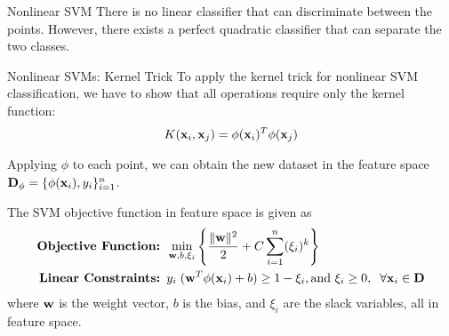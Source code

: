 \begin{frame}{Nonlinear SVM}
There is no linear classif\/{i}er that can discriminate between the
points. However, there exists a perfect quadratic classif\/{i}er that can
separate the two classes.

\begin{figure}[!t]
\end{figure}
\end{frame}


\begin{frame}{Nonlinear SVMs: Kernel Trick}
To apply the kernel trick for nonlinear SVM classif\/{i}cation, we
have to show that all operations require only the kernel function:
\begin{align*}
K(\mathbf{x}_i, \mathbf{x}_{j}) = \phi(\mathbf{x}_i)^T \phi(\mathbf{x}_{j})
\end{align*}

\medskip
Applying $\phi$ to each point, we
can obtain the new dataset in the
feature space
$\mathbf{D}_\phi = \{ \phi(\mathbf{x}_i), y_i \}_{i=1}^n$.

\medskip
The SVM objective function in
feature space is given as
\begin{align*}
        \mbox{\bf Objective Function: } & \min_{\mathbf{w},b,\xi_i}
        \left\{ {\| \mathbf{w} \|^2 \over 2} + C \sum_{i=1}^n (\xi_i)^k\right\}\\
  \mbox{\bf Linear Constraints: } & y_i \; (\mathbf{w}^T\phi(\mathbf{x}_i) + b) \ge
  1 - \xi_i, \text{and } \xi_i \ge 0,\;\; \forall \mathbf{x}_i \in \mathbf{D}
\end{align*}
where $\mathbf{w}$ is the weight vector, $b$ is the bias, and $\xi_i$ are the slack
variables, all in feature space.
\end{frame}



